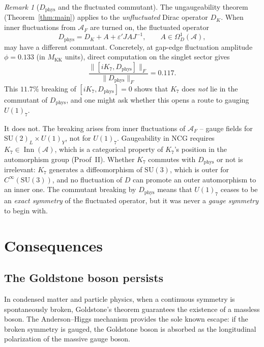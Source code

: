 \documentclass[12pt]{article}
\theoremstyle{definition}
\theoremstyle{remark}
\newtheorem{remark}[theorem]{Remark}
\newcommand{\Alg}{\mathcal{A}}
\newcommand{\Inn}{\operatorname{Inn}}
\newcommand{\KK}{M_{\mathrm{KK}}}
\begin{document}
\begin{remark}[$D_{\mathrm{phys}}$ and the fluctuated commutant]\label{rem:dphys}
The ungaugeability theorem (Theorem~\ref{thm:main}) applies to the \emph{unfluctuated} Dirac operator $D_K$.  When inner fluctuations from $\Alg_F$ are turned on, the fluctuated operator
\[
  D_{\mathrm{phys}} = D_K + A + \varepsilon' J A J^{-1}, \qquad A \in \Omega^1_D(\Alg),
\]
may have a different commutant.  Concretely, at gap-edge fluctuation amplitude $\phi = 0.133$ (in $\KK$ units), direct computation on the singlet sector gives
\[
  \frac{\|[iK_7, D_{\mathrm{phys}}]\|_F}{\|D_{\mathrm{phys}}\|_F} = 0.117 .
\]
This $11.7\%$ breaking of $[iK_7, D_{\mathrm{phys}}] = 0$ shows that $K_7$ does \emph{not} lie in the commutant of $D_{\mathrm{phys}}$, and one might ask whether this opens a route to gauging $U(1)_7$.

It does not.  The breaking arises from inner fluctuations of $\Alg_F$ -- gauge fields for $\mathrm{SU}(2)_L \times U(1)_Y$, not for $U(1)_7$.  Gaugeability in NCG requires $K_7 \in \Inn(\Alg)$, which is a categorical property of $K_7$'s position in the automorphism group (Proof~II).  Whether $K_7$ commutes with $D_{\mathrm{phys}}$ or not is irrelevant: $K_7$ generates a diffeomorphism of $\mathrm{SU}(3)$, which is outer for $C^\infty(\mathrm{SU}(3))$, and no fluctuation of $D$ can promote an outer automorphism to an inner one.  The commutant breaking by $D_{\mathrm{phys}}$ means that $U(1)_7$ ceases to be an \emph{exact symmetry} of the fluctuated operator, but it was never a \emph{gauge symmetry} to begin with.
\end{remark}


\section{Consequences}
\label{sec:consequences}

\subsection{The Goldstone boson persists}
\label{subsec:goldstone}

In condensed matter and particle physics, when a continuous symmetry is spontaneously broken, Goldstone's theorem guarantees the existence of a massless boson.  The Anderson--Higgs mechanism \cite{Anderson1963, Higgs1964} provides the sole known escape: if the broken symmetry is gauged, the Goldstone boson is absorbed as the longitudinal polarization of the massive gauge boson.
\end{document}
